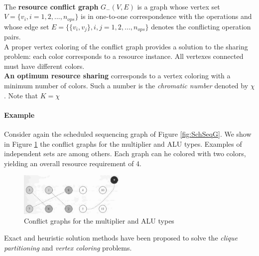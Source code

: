 \bigskip \\
The \textbf{resource conflict graph} $ G_{-}(V,E) $ is a graph whose vertex set $ V = \lbrace v_i,i=1,2,...,n_{ops} \rbrace $ is in one-to-one correspondence  with  the operations and 	whose edge set $ E = \lbrace \lbrace v_i, v_j \rbrace ,i,j=1,2,...,n_{ops} \rbrace $ denotes  the conflicting operation pairs.
\bigskip \\
A  proper vertex coloring of the conflict graph provides a solution to the sharing problem: each color corresponds to a resource instance. All vertexes connected must have different colors.\\
\textbf{An optimum resource sharing} corresponds to a vertex coloring with a minimum number of colors. Such a number is the  \textit{chromatic number} denoted by $ \chi $.  Note that $ K= \chi $

\paragraph{Example}
Consider again the scheduled sequencing graph of Figure \ref{fig:SchSeqG}. We show in Figure  \ref{fig:ConfGr}  the conflict graphs for the multiplier and  ALU  types. Examples of independent sets are   among others. Each graph  can  he colored with two colors, yielding an overall resource requirement of  4.
\begin{figure}[H]
    \centering
    \includegraphics[width=0.45\textwidth]{./Cap5/Images/Image03.png}
    \caption{Conflict  graphs  for  the  multiplier  and  ALU  types}
    \label{fig:ConfGr}
\end{figure}	
Exact and heuristic solution methods have been proposed to solve the \textit{clique partitioning} and \textit{vertex coloring} problems.


